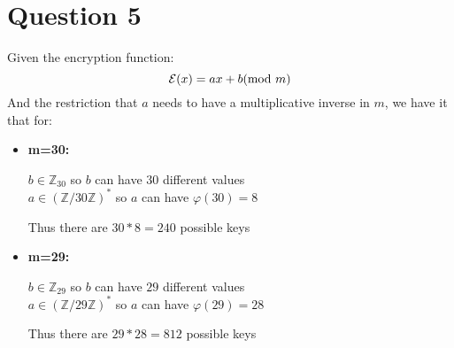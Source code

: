 \documentclass{article}
\numberwithin{equation}{subsection}
\begin{document}
	\section*{Question 5}
	Given the encryption function:
	\begin{equation}\notag
		\mathcal{E}(x) = ax +b (\textrm{mod}\ m) 
	\end{equation}
	And the restriction that $a$ needs to have a multiplicative inverse in $m$, we have it that for:
	\begin{itemize}
		\item \textbf{m=30:}

			$b \in \mathbb{Z}_{30}$ so $b$ can have $30$ different values\\
			$a \in (\mathbb{Z}/30\mathbb{Z})^*$ so $a$ can have $\varphi(30)=8$
			

			Thus there are $30*8=240$ possible keys 
		
		\item \textbf{m=29:}

			$b \in \mathbb{Z}_{29}$ so $b$ can have $29$ different values\\
			$a \in (\mathbb{Z}/29\mathbb{Z})^*$ so $a$ can have $\varphi(29)=28$
			

			Thus there are $29*28 = 812$ possible keys 
			
	\end{itemize}
	
	\thispagestyle{fancy}
\end{document}
